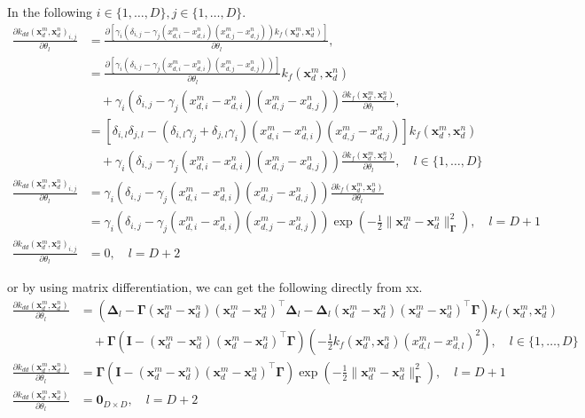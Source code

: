 \documentclass[10pt,oneside,a4paper,notitlepage]{article}
\newcommand{\vect}[1]{\mathbf{#1}}
\begin{document}
In the following $i\in\{1,\ldots,D\},j\in\{1,\ldots,D\}$.
\begin{align}
\frac{\partial k_{dd}(\vect x_d^m, \vect x_d^n)_{i,j}}{\partial\theta_l}&= \frac{\partial\left[\gamma_i\left(\delta_{i,j} - \gamma_j(x_{d,i}^m - x_{d,i}^n)(x_{d,j}^m - x_{d,j}^n)\right)k_f(\vect x_d^m, \vect x_d^n)\right]}{\partial\theta_l}, \\
&= \frac{\partial\left[\gamma_i\left(\delta_{i,j} - \gamma_j(x_{d,i}^m - x_{d,i}^n)(x_{d,j}^m - x_{d,j}^n)\right)\right]}{\partial\theta_l}k_f(\vect x_d^m, \vect x_d^n) \nonumber \\
&\quad+\gamma_i\left(\delta_{i,j} - \gamma_j(x_{d,i}^m - x_{d,i}^n)(x_{d,j}^m - x_{d,j}^n)\right)\frac{\partial k_f(\vect x_d^m, \vect x_d^n)}{\partial\theta_l},\\
&= \left[\delta_{i,l}\delta_{j,l} - (\delta_{i,l}\gamma_j + \delta_{j,l}\gamma_i)(x_{d,i}^m - x_{d,i}^n)(x_{d,j}^m - x_{d,j}^n)\right]k_f(\vect x_d^m, \vect x_d^n) \nonumber \\
&\quad+\gamma_i\left(\delta_{i,j} - \gamma_j(x_{d,i}^m - x_{d,i}^n)(x_{d,j}^m - x_{d,j}^n)\right)\frac{\partial k_f(\vect x_d^m, \vect x_d^n)}{\partial\theta_l}, \quad l\in\{1,\ldots,D\}\\ 
\frac{\partial k_{dd}(\vect x_d^m, \vect x_d^n)_{i,j}}{\partial\theta_l}&=\gamma_i\left(\delta_{i,j} - \gamma_j(x_{d,i}^m - x_{d,i}^n)(x_{d,j}^m - x_{d,j}^n)\right)\frac{\partial k_f(\vect x_d^m, \vect x_d^n)}{\partial\theta_l} \\
&=\gamma_i\left(\delta_{i,j} - \gamma_j(x_{d,i}^m - x_{d,i}^n)(x_{d,j}^m - x_{d,j}^n)\right)\exp\left(-\frac{1}{2}\|\vect x_d^m - \vect x_d^n\|_{\boldsymbol\Gamma}^2\right),\quad l=D+1 \\
\frac{\partial k_{dd}(\vect x_d^m, \vect x_d^n)_{i,j}}{\partial\theta_l}&= 0,\quad l=D+2 
\end{align}

or by using matrix differentiation, we can get the following directly from xx.
\begin{align}
\frac{\partial k_{dd}(\vect x_d^m, \vect x_d^n)}{\partial\theta_l}&= \left(
\boldsymbol\Delta_l - \boldsymbol\Gamma(\vect x_d^m - \vect x_d^n)(\vect x_d^m - \vect x_d^n)^\top\boldsymbol\Delta_l - \boldsymbol\Delta_l(\vect x_d^m - \vect x_d^n)(\vect x_d^m - \vect x_d^n)^\top\boldsymbol\Gamma\right)k_f(\vect x_d^m, \vect x_d^n) \nonumber \\
&\quad+\boldsymbol\Gamma \left(\vect I - (\vect x_d^m - \vect x_d^n)(\vect x_d^m - \vect x_d^n)^\top\boldsymbol\Gamma\right)(-\frac{1}{2}k_f(\vect x_d^m, \vect x_d^n)(x_{d,l}^m - x_{d,l}^n)^2), \quad l\in\{1,\ldots,D\}\\ 
\frac{\partial k_{dd}(\vect x_d^m, \vect x_d^n)}{\partial\theta_l}&=\boldsymbol\Gamma \left(\vect I - (\vect x_d^m - \vect x_d^n)(\vect x_d^m - \vect x_d^n)^\top\boldsymbol\Gamma\right)\exp\left(-\frac{1}{2}\|\vect x_d^m - \vect x_d^n\|_{\boldsymbol\Gamma}^2\right),\quad l=D+1 \\
\frac{\partial k_{dd}(\vect x_d^m, \vect x_d^n)}{\partial\theta_l}&= \vect 0_{D\times D},\quad l=D+2 
\end{align}
\end{document}
